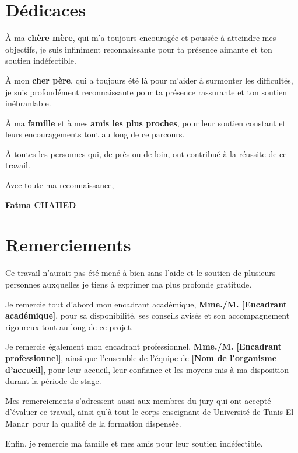 \documentclass[a4paper, 12pt]{report}
\newcommand{\rapportEntreprise}{[Nom de l'organisme d'accueil]} %
\newcommand{\Universite}{Université de Tunis El Manar} %
\newcommand{\Etudiante}{Fatma CHAHED} %
\newcommand{\Encadranted}{Mme./M. [Encadrant académique]} %
\newcommand{\Encadrantew}{Mme./M. [Encadrant professionnel]} %
\begin{document}
\section*{ \centering Dédicaces }


À ma \textbf{chère mère}, qui m'a toujours encouragée et poussée à atteindre mes objectifs, je suis infiniment reconnaissante pour ta présence aimante et ton soutien indéfectible.
\vspace{0.5cm}

À mon \textbf{cher père}, qui a toujours été là pour m'aider à surmonter les difficultés, je suis profondément reconnaissante pour ta présence rassurante et ton soutien inébranlable.
\vspace{0.5cm}

À ma \textbf{famille} et à mes \textbf{amis les plus proches}, pour leur soutien constant et leurs encouragements tout au long de ce parcours.
\vspace{0.5cm}

À toutes les personnes qui, de près ou de loin, ont contribué à la réussite de ce travail.


Avec toute ma reconnaissance,


\begin{flushright}
\textbf{\Etudiante}
\end{flushright}

\newpage
\section* {\centering Remerciements }
Ce travail n'aurait pas été mené à bien sans l'aide et le soutien de plusieurs personnes auxquelles je tiens à exprimer ma plus profonde gratitude.

Je remercie tout d'abord mon encadrant académique, \textbf{\Encadranted}, pour sa disponibilité, ses conseils avisés et son accompagnement rigoureux tout au long de ce projet.

Je remercie également mon encadrant professionnel, \textbf{\Encadrantew}, ainsi que l'ensemble de l'équipe de \textbf{\rapportEntreprise}, pour leur accueil, leur confiance et les moyens mis à ma disposition durant la période de stage.

Mes remerciements s'adressent aussi aux membres du jury qui ont accepté d'évaluer ce travail, ainsi qu'à tout le corps enseignant de \Universite\ pour la qualité de la formation dispensée.

Enfin, je remercie ma famille et mes amis pour leur soutien indéfectible.
\vspace{1cm}
\end{document}
